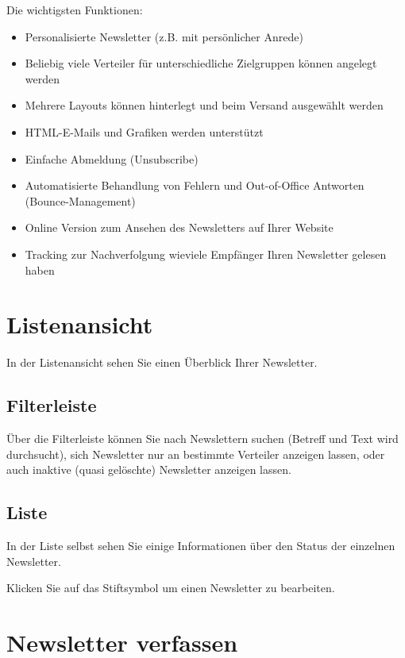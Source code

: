 \documentclass[article, a4paper, oneside, 11pt]{memoir}
\begin{document}
Die wichtigsten Funktionen:

\begin{itemize}
 \item Personalisierte Newsletter (z.B. mit persönlicher Anrede)
 \item Beliebig viele Verteiler für unterschiedliche Zielgruppen können angelegt werden
 \item Mehrere Layouts können hinterlegt und beim Versand ausgewählt werden
 \item HTML-E-Mails und Grafiken werden unterstützt
 \item Einfache Abmeldung (Unsubscribe)
 \item Automatisierte Behandlung von Fehlern und Out-of-Office Antworten (Bounce-Management)
 \item Online Version zum Ansehen des Newsletters auf Ihrer Website
 \item Tracking zur Nachverfolgung wieviele Empfänger Ihren Newsletter gelesen haben
\end{itemize}

\chapter{Listenansicht}

In der Listenansicht sehen Sie einen Überblick Ihrer Newsletter.

\section{Filterleiste}

Über die Filterleiste können Sie nach Newslettern suchen (Betreff und Text wird durchsucht), sich Newsletter nur an bestimmte Verteiler anzeigen lassen, oder auch inaktive (quasi gelöschte) Newsletter anzeigen lassen.

\section{Liste}

In der Liste selbst sehen Sie einige Informationen über den Status der einzelnen Newsletter.

Klicken Sie auf das Stiftsymbol um einen Newsletter zu bearbeiten.


\chapter{Newsletter verfassen}
\end{document}
